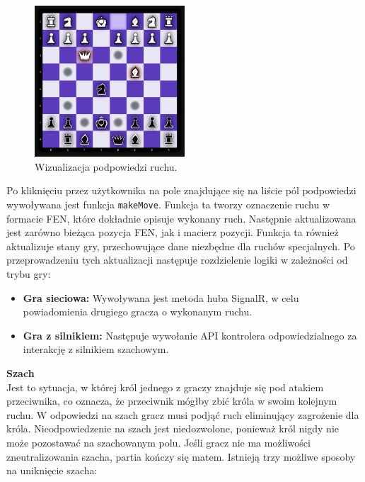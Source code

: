 \documentclass[twoside]{projektInzynierskiMS1}
\begin{document}
\vspace{0.5cm}
\begin{figure}[h!]
    \centering
    \includegraphics[width=0.5\textwidth]{images/imp_move_tips.png}
    \caption{Wizualizacja podpowiedzi ruchu.}
\end{figure}
\vspace{0.5cm}

\noindent
Po kliknięciu przez użytkownika na pole znajdujące się na liście pól podpowiedzi wywoływana jest funkcja \texttt{makeMove}. Funkcja ta tworzy oznaczenie ruchu w formacie FEN, które dokładnie opisuje wykonany ruch. Następnie aktualizowana jest zarówno bieżąca pozycja FEN, jak i macierz pozycji. Funkcja ta również aktualizuje stany gry, przechowujące dane niezbędne dla ruchów specjalnych. Po przeprowadzeniu tych aktualizacji następuje rozdzielenie logiki w zależności od trybu gry:

\begin{itemize}
    \item \textbf{Gra sieciowa:} Wywoływana jest metoda huba SignalR, w celu powiadomienia drugiego gracza o wykonanym ruchu.
    \item \textbf{Gra z silnikiem:} Następuje wywołanie API kontrolera odpowiedzialnego za interakcję z silnikiem szachowym.
\end{itemize}

\newpage

\noindent \textbf{Szach}\\
Jest to sytuacja, w której król jednego z graczy znajduje się pod atakiem przeciwnika, co oznacza, że przeciwnik mógłby zbić króla w swoim kolejnym ruchu. W odpowiedzi na szach gracz musi podjąć ruch eliminujący zagrożenie dla króla. Nieodpowiedzenie na szach jest niedozwolone, ponieważ król nigdy nie może pozostawać na szachowanym polu. Jeśli gracz nie ma możliwości zneutralizowania szacha, partia kończy się matem. Istnieją trzy możliwe sposoby na uniknięcie szacha:
\end{document}
